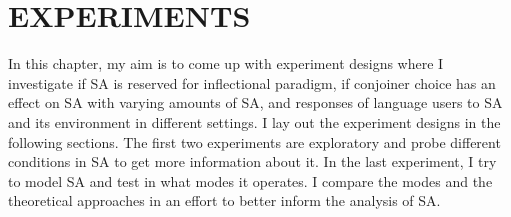 \chapter{\MakeUppercase{Experiments}}
\setcounter{exx}{0}

In this chapter, my aim is to come up with experiment designs where I investigate if SA is reserved for inflectional paradigm, if conjoiner choice has an effect on SA with varying amounts of SA, and responses of language users to SA and its environment in different settings. I lay out the experiment designs in the following sections. The first two experiments are exploratory and probe different conditions in SA to get more information about it. In the last experiment, I try to model SA and test in what modes it operates. I compare the modes and the theoretical approaches in an effort to better inform the analysis of SA.






